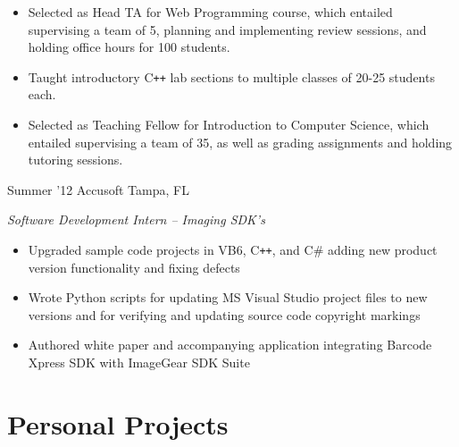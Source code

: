 \documentclass[print]{friggeri-cv} %
\begin{document}
\begin{entrylist}
{\begin{itemize}
\item Selected as Head TA for Web Programming course, which entailed supervising a team of 5, planning and implementing review sessions, and holding office hours for 100 students.
\item Taught introductory C{}\texttt{++} lab sections to multiple classes of 20-25 students each.
\item Selected as Teaching Fellow for Introduction to Computer Science, which entailed supervising a team of 35, as well as grading assignments and holding tutoring sessions.
\end{itemize} }
\entry
{Summer '12}
{Accusoft }
{Tampa, FL}
{\emph{Software Development Intern -- Imaging SDK's}
\begin{itemize}
\item Upgraded sample code projects in VB6, C{}\texttt{++}, and C\# adding new product version functionality and fixing defects
\item Wrote Python scripts for updating MS Visual Studio project files to new versions and for verifying and updating source code copyright markings
\item Authored white paper and accompanying application integrating Barcode Xpress SDK with ImageGear SDK Suite
\end{itemize}}
\end{entrylist}



\section{Personal Projects}
\end{document}
